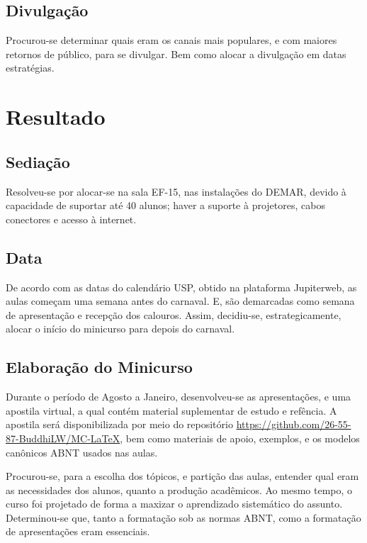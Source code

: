 \documentclass[
	12pt,				%
	openright,			%
	oneside,			%
	a4paper,			%
        brazil,				%
	]{abntex2}
\begin{document}
\section{Divulgação}

Procurou-se determinar quais eram os canais mais populares, e com
maiores retornos de público, para se divulgar. Bem como alocar a divulgação em datas estratégias.





\chapter{Resultado}

\section{Sediação}
Resolveu-se por alocar-se na sala EF-15, nas instalações do DEMAR,
devido à capacidade de suportar até 40 alunos; haver a suporte à
projetores, cabos conectores e acesso à internet.

\section{Data}
De acordo com as datas do calendário USP, obtido na plataforma
Jupiterweb, as aulas começam uma semana antes do carnaval. E, são
demarcadas como semana de apresentação e recepção dos calouros. Assim,
decidiu-se, estrategicamente, alocar o início do minicurso para depois
do carnaval.

\section{Elaboração do Minicurso}
Durante o período de Agosto a Janeiro, desenvolveu-se as apresentações, e
uma apostila virtual, a qual contém material suplementar de estudo e
refência. A apostila será
disponibilizada por meio do repositório
\url{https://github.com/26-55-87-BuddhiLW/MC-LaTeX}, bem como
materiais de apoio, exemplos, e os modelos canônicos ABNT usados nas aulas.

Procurou-se, para a escolha dos tópicos, e partição das aulas,
entender qual eram as necessidades dos alunos, quanto a produção
acadêmicos. Ao mesmo tempo, o curso foi projetado de forma a maxizar o
aprendizado sistemático do assunto.  Determinou-se que, tanto a
formatação sob as normas ABNT, como a formatação de apresentações eram
essenciais.
\end{document}
